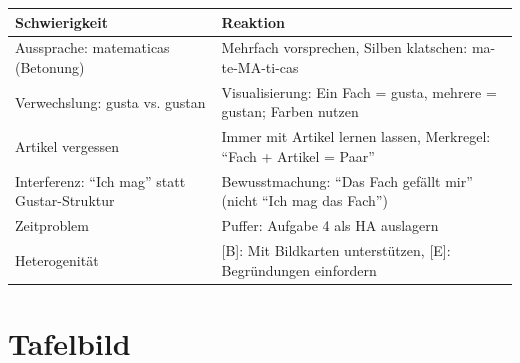 \documentclass[11pt,a4paper]{article}
\begin{document}
\begin{tabular}{|p{5cm}|p{8cm}|}
\hline
\textbf{Schwierigkeit} & \textbf{Reaktion} \\
\hline
Aussprache: matematicas (Betonung) & Mehrfach vorsprechen, Silben klatschen: ma-te-MA-ti-cas \\
\hline
Verwechslung: gusta vs. gustan & Visualisierung: Ein Fach = gusta, mehrere = gustan; Farben nutzen \\
\hline
Artikel vergessen & Immer mit Artikel lernen lassen, Merkregel: ``Fach + Artikel = Paar'' \\
\hline
Interferenz: ``Ich mag'' statt Gustar-Struktur & Bewusstmachung: ``Das Fach gefällt mir'' (nicht ``Ich mag das Fach'') \\
\hline
Zeitproblem & Puffer: Aufgabe 4 als HA auslagern \\
\hline
Heterogenität & [B]: Mit Bildkarten unterstützen, [E]: Begründungen einfordern \\
\hline
\end{tabular}

\section{Tafelbild}

\begin{center}
\end{center}
\end{document}
